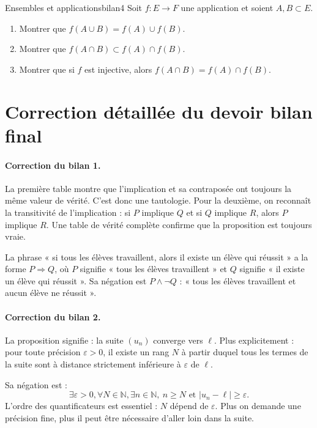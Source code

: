 \documentclass[11pt,a4paper]{article}
\newcommand{\N}{\mathbb{N}}
\begin{document}
\begin{exercicebox}{Ensembles et applications}{bilan4}
Soit $f:E\to F$ une application et soient $A,B\subset E$.
\begin{enumerate}
  \item Montrer que $f(A\cup B)=f(A)\cup f(B)$.
  \item Montrer que $f(A\cap B)\subset f(A)\cap f(B)$.
  \item Montrer que si $f$ est injective, alors $f(A\cap B)=f(A)\cap f(B)$.
\end{enumerate}
\end{exercicebox}

\section{Correction détaillée du devoir bilan final}

\paragraph{Correction du bilan 1.}
La première table montre que l'implication et sa contraposée ont toujours la même valeur de vérité. C'est donc une tautologie. Pour la deuxième, on reconnaît la transitivité de l'implication : si $P$ implique $Q$ et si $Q$ implique $R$, alors $P$ implique $R$. Une table de vérité complète confirme que la proposition est toujours vraie.

La phrase « si tous les élèves travaillent, alors il existe un élève qui réussit » a la forme $P\Rightarrow Q$, où $P$ signifie « tous les élèves travaillent » et $Q$ signifie « il existe un élève qui réussit ». Sa négation est $P\land\neg Q$ : « tous les élèves travaillent et aucun élève ne réussit ».

\paragraph{Correction du bilan 2.}
La proposition signifie : la suite $(u_n)$ converge vers $\ell$. Plus explicitement : pour toute précision $\varepsilon>0$, il existe un rang $N$ à partir duquel tous les termes de la suite sont à distance strictement inférieure à $\varepsilon$ de $\ell$.

Sa négation est :
\[
\exists \varepsilon>0,\forall N\in\N,\exists n\in\N,\ n\geq N\text{ et } |u_n-\ell|\geq\varepsilon.
\]
L'ordre des quantificateurs est essentiel : $N$ dépend de $\varepsilon$. Plus on demande une précision fine, plus il peut être nécessaire d'aller loin dans la suite.
\end{document}
